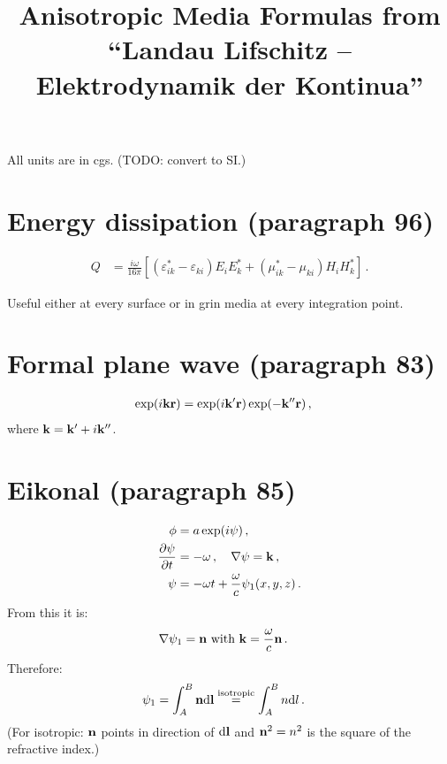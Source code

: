 \documentclass[a4paper,12pt]{article}
\title{Anisotropic Media Formulas from ``Landau Lifschitz -- Elektrodynamik der Kontinua''}
\newcommand{\vct}[1]{{\bf #1}}
\begin{document}
\maketitle

All units are in cgs. (TODO: convert to SI.)

\section{Energy dissipation (paragraph 96)}
\begin{align}
  Q &= \frac{i \omega}{16 \pi} 
  \left[
    (\varepsilon^\ast_{ik} - \varepsilon_{ki})E_i E_k^\ast
    + (\mu^\ast_{ik} - \mu_{ki})H_i H_k^\ast
  \right]\,.
\end{align}

Useful either at every surface or in grin media at
every integration point.

\section{Formal plane wave (paragraph 83)}
\begin{align}
 \exp(i \vct{k} \vct{r}) &= \exp(i \vct{k}^\prime \vct{r})
 \exp(-\vct{k}^{\prime\prime} \vct{r})\,,
\end{align}
where $\vct{k} = \vct{k}^\prime + i \vct{k}^{\prime\prime}$.

\section{Eikonal (paragraph 85)}

\begin{align}
 \phi &= a \exp(i \psi)\,,\\
 \frac{\partial \psi}{\partial t} &= -\omega\,,\quad
 \vct{\nabla} \psi = \vct{k}\,,\\
 \psi &= -\omega t + \frac{\omega}{c} \psi_1(x, y, z)\,.
\end{align}
From this it is:
\begin{align}
 \vct{\nabla}\psi_1 &= \vct{n}\text{ with }\vct{k} = \frac{\omega}{c}\vct{n}\,.
\end{align}
Therefore:
\begin{align}
 \psi_1 &= \int_A^B \vct{n}\text{d}\vct{l} \stackrel{\text{isotropic}}{=} \int_A^B n \text{d}l\,.
\end{align}
(For isotropic: $\vct{n}$ points in direction of $\text{d}\vct{l}$
and $\vct{n}^2 = n^2$ is the square of the refractive index.)
\end{document}
